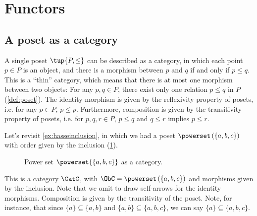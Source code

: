 \section{Functors}

\subsection{A poset as a category}
\label{sec:posetsarecats}
A single poset $\tup{P, \leq}$ can be described as a category, in which
each point $p\in P$ is an object, and there is a morphism between
$p$ and $q$ if and only if $p \leq q$. This is a ``thin'' category, which means that there is at most one morphism
between two objects: For any $p,q\in P$, there exist only one relation $p\leq q$ in $P$ (\cref{def:poset}). The identity morphism is given by the reflexivity property of posets, i.e. for any $p\in P$, $p\leq p$. Furthermore, composition is given by the transitivity property of posets, i.e. for $p,q,r \in P$, $p\leq q$ and $q\leq r$ implies $p\leq r$.

\begin{example}
Let's revisit \cref{ex:hasseinclusion}, in which we had a poset $\powerset\left(\{a,b,c\}\right)$ with order given by the inclusion (\cref{fig:posetascat}).
\begin{figure}[h!]
\begin{center}
\end{center}
\caption{Power set $\powerset{\{a,b,c\}}$ as a category. \label{fig:posetascat}}
\end{figure}
This is a category $\CatC$, with $\ObC=\powerset\left(\{a,b,c\}\right)$ and morphisms given by the inclusion. Note that we omit to draw self-arrows for the identity morphisms. Composition is given by the transitivity of the poset. Note, for instance, that since $\{a\}\subseteq \{a,b\}$ and $\{a,b\} \subseteq \{a,b,c\}$, we can say $\{a\}\subseteq \{a,b,c\}$.
\end{example}


